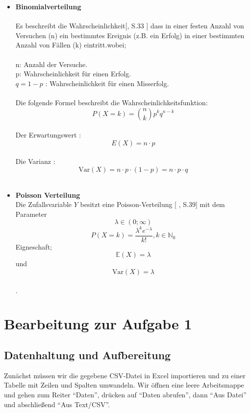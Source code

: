 \documentclass[1pt]{article}
\newcommand{\Var}{\mathrm{Var}}
\begin{document}
\begin{itemize}
\item \textbf {Binomialverteilung }\\
\label{Binomialverteilung}
\\Es beschreibt die Wahrscheinlichkeit[\cite{DeGruyterStochastik}, S.33 ]  dass in einer festen Anzahl von Versuchen (n) ein bestimmtes Ereignis (z.B. ein Erfolg) in einer bestimmten Anzahl von Fällen (k) eintritt.wobei;\\
\\n: Anzahl der Versuche.
\\p: Wahrscheinlichkeit für einen Erfolg.
\\\( q = 1 - p \) : Wahrscheinlichkeit für einen Misserfolg.\\
\\Die folgende Formel beschreibt die Wahrscheinlichkeitsfunktion:  $$ P(X = k) = \binom{n}{k} p^k q^{n-k} $$
 \\ Der Erwartungswert :\[E(X) = n \cdot p\]
\\ Die Varianz :\[\Var(X) =  n \cdot p \cdot (1 - p) = n \cdot p \cdot q\]\\

\item \textbf {Poisson Verteilung} \\
\label{Poisson Verteilung}
Die Zufallsvariable  \(Y\) besitzt eine Poisson-Verteilung [\cite{DeGruyterStochastik} , S.39] mit
dem Parameter  \[\lambda \in (0; \infty)\]
$$P(X = k) = \frac{\lambda^k e^{-\lambda}}{k!} ,k \in \mathbb{N}_0 $$
 Eigneschaft;\\
$$\mathbb{E}(X)= \lambda$$ und $$\Var(X)= \lambda$$\\
.
\end{itemize}
\newpage 

\section{ Bearbeitung zur Aufgabe 1}
\subsection{Datenhaltung und Aufbereitung}
Zunächst müssen wir die gegebene CSV-Datei in Excel importieren und zu einer Tabelle mit Zeilen und Spalten umwandeln. Wir öffnen eine leere Arbeitsmappe und gehen zum Reiter \enquote{Daten}, drücken auf \enquote{Daten abrufen}, dann \enquote{Aus Datei} und abschließend \enquote{Aus Text/CSV}.
\end{document}
